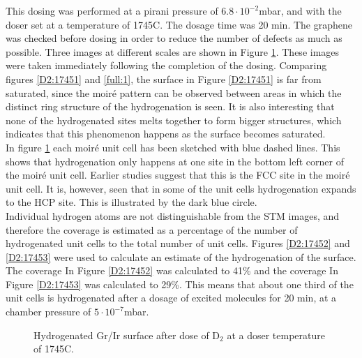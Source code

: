 This dosing was performed at a pirani pressure of $6.8 \cdot 10^{-2}$mbar, and with the doser set at a temperature of 1745\degree C. The dosage time was 20 min. The graphene was checked before dosing in order to reduce the number of defects as much as possible. Three images at different scales are shown in Figure \ref{D2:1745}. These images were taken immediately following the completion of the dosing. Comparing figures \ref{D2:17451} and \ref{full:1}, the surface in Figure \ref{D2:17451} is far from saturated, since the moiré pattern can be observed between areas in which the distinct ring structure of the hydrogenation is seen. It is also interesting that none of the hydrogenated sites melts together to form bigger structures, which indicates that this phenomenon happens as the surface becomes saturated.\\
In figure \ref{D2:1745} each moiré unit cell has been sketched with blue dashed lines. This shows that hydrogenation only happens at one site in the bottom left corner of the moiré unit cell. Earlier studies suggest that this is the FCC site in the moiré unit cell.\cite{Jakobunpublished} It is, however, seen that in some of the unit cells hydrogenation expands to the HCP site. This is illustrated by the dark blue circle.\\
Individual hydrogen atoms are not distinguishable from the STM images, and therefore the coverage is estimated as a percentage of the number of hydrogenated unit cells to the total number of unit cells. Figures \ref{D2:17452} and \ref{D2:17453} were used to calculate an estimate of the hydrogenation of the surface. The coverage In Figure \ref{D2:17452} was calculated to 41\% and the coverage In Figure \ref{D2:17453} was calculated to 29\%. This means that about one third of the unit cells is hydrogenated after a dosage of excited molecules for 20 min, at a chamber pressure of $5 \cdot 10^{-7}$mbar.

\begin{figure}[H]
\caption{Hydrogenated Gr/Ir surface after dose of D$_2$ at a doser temperature of 1745\degree C.}
\label{D2:1745}
\end{figure}

